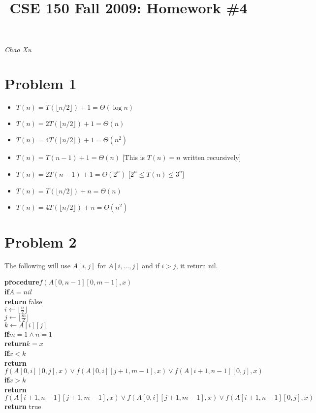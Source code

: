 \documentclass[letter]{article}
\title{CSE 150 Fall 2009: Homework \#4}
\date{}
\newcommand{\aprocedure}{\textbf{pr}\=\+\textbf{ocedure}\xspace}
\newcommand{\aif}{\textbf{if}\=\+\xspace}
\newcommand{\aend}{\-\kill}
\newcommand{\areturn}{\textbf{return}\xspace}
\begin{document}
\maketitle
\vspace{-.5in}
\emph{Chao Xu}

\section*{Problem 1}
\begin{itemize}
\item $T(n)=T(\lfloor n/2\rfloor)+1=\Theta(\log n)$
\item $T(n)=2T(\lfloor n/2\rfloor)+1=\Theta(n)$
\item $T(n)=4T(\lfloor n/2\rfloor)+1=\Theta(n^2)$
\item $T(n)=T(n-1)+1=\Theta(n)$  [This is $T(n) = n$ written recursively]
\item $T(n)=2T(n-1)+1=\Theta(2^n)$  [$2^n\leq T(n)\leq 3^n$]
\item $T(n)=T(\lfloor n/2\rfloor)+n=\Theta(n)$
\item $T(n)=4T(\lfloor n/2\rfloor)+n=\Theta(n^2)$
\end{itemize}

\section*{Problem 2}
The following will use $A[i,j]$ for $A[i,\ldots,j]$ and if $i>j$, it return nil.
\begin{tabbing}
\aprocedure $f(A[0,n-1][0,m-1],x)$\\
\aif $A=nil$\\
\areturn false\\
\aend
$i \gets \lfloor \frac{n}{2} \rfloor$\\
$j \gets \lfloor \frac{m}{2} \rfloor$\\
$k \gets A[i][j]$\\
\aif $m=1 \wedge n=1$\\
\areturn $k=x$\\
\aend
\aif $x<k$\\
\areturn $f(A[0,i][0,j],x) \vee f(A[0,i][j+1,m-1],x) \vee f(A[i+1,n-1][0,j],x)$ \\
\aend
\aif $x>k$\\
\areturn $f(A[i+1,n-1][j+1,m-1],x) \vee f(A[0,i][j+1,m-1],x) \vee f(A[i+1,n-1][0,j],x)$ \\
\aend
\areturn true
\end{tabbing}
\end{document}
